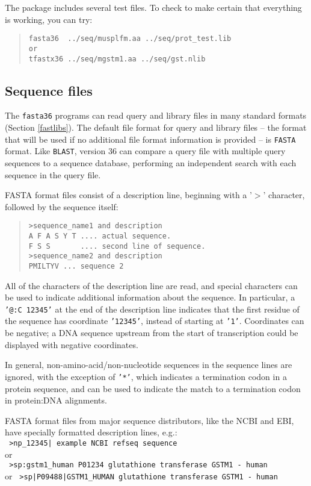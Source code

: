 \documentclass[11pt]{article}
\begin{document}
The package includes several test files.  To check to make certain
that everything is working, you can try:
\begin{quote}
\begin{verbatim}
fasta36  ../seq/musplfm.aa ../seq/prot_test.lib
or
tfastx36 ../seq/mgstm1.aa ../seq/gst.nlib
\end{verbatim}
\end{quote}

\subsection{Sequence files}

The \texttt{fasta36} programs can read query and library files in many
standard formats (Section \ref{fastlibs}). The default file format for query and library files
-- the format that will be used if no additional file format
information is provided -- is \texttt{FASTA} format. Like
\texttt{BLAST}, version 36 can compare a query file with multiple
query sequences to a sequence database, performing an independent
search with each sequence in the query file.

FASTA format files consist of a description line, beginning
with a '$>$' character, followed by the sequence itself:
\begin{quote}
\begin{verbatim}
>sequence_name1 and description
A F A S Y T .... actual sequence.
F S S       .... second line of sequence.
>sequence_name2 and description 
PMILTYV ... sequence 2
\end{verbatim}
\end{quote}
All of the characters of the description line are read, and special
characters can be used to indicate additional information about the
sequence. In particular, a \texttt{'@:C 12345'} at the end of the
description line indicates that the first residue of the sequence has
coordinate \texttt{'12345'}, instead of starting at \texttt{'1'}.
Coordinates can be negative; a DNA sequence upstream from the start of
transcription could be displayed with negative coordinates.

In general, non-amino-acid/non-nucleotide sequences in the sequence
lines are ignored, with the exception of \texttt{'*'}, which indicates
a termination codon in a protein sequence, and can be used to indicate
the match to a termination codon in protein:DNA alignments.

FASTA format files from major sequence distributors, like the NCBI and
EBI, have specially formatted description lines, e.g.:\\
\indent
\texttt{
>np\_12345| example NCBI refseq sequence\\
}
or\\
\indent
\texttt{
>sp:gstm1\_human P01234 glutathione transferase GSTM1 - human\\
}
or
\indent
\texttt{
>sp|P09488|GSTM1\_HUMAN glutathione transferase GSTM1 - human\\
}
\end{document}
